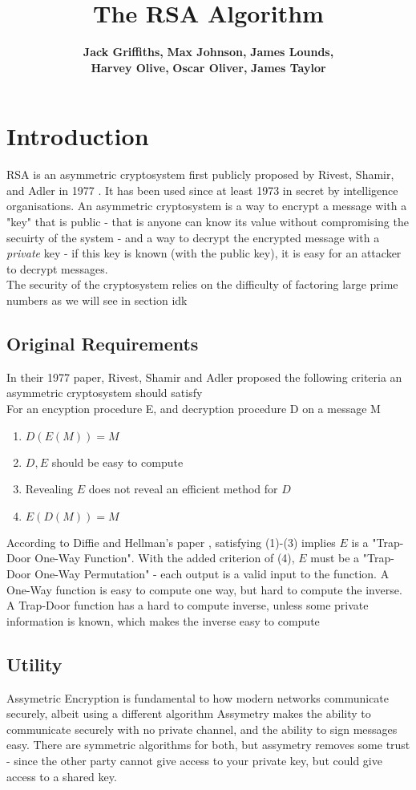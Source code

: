 \documentclass{article}
\author{
    {\bf Jack Griffiths,}
    {\bf Max Johnson,}
    {\bf James Lounds, } \\
    {\bf Harvey Olive, }
    {\bf Oscar Oliver, }
    {\bf James Taylor}
}
\title{The RSA Algorithm}
\begin{document}
\maketitle
\newpage

\section{Introduction}
RSA is an asymmetric cryptosystem first publicly proposed by Rivest, Shamir, and Adler in 1977 \cite{RSA}.
It has been used since at least 1973 in secret by intelligence organisations.
An asymmetric cryptosystem is a way to encrypt a message with a "key" that is public
- that is anyone can know its value without compromising the secuirty of the system -
and a way to decrypt the encrypted message with a \emph{private} key
- if this key is known (with the public key), it is easy for an attacker to decrypt messages.
\\
The security of the cryptosystem relies on the difficulty of factoring large prime numbers as we will see in section idk
\subsection{Original Requirements}
In their 1977 paper, Rivest, Shamir and Adler proposed the following criteria an asymmetric cryptosystem should satisfy
\\For an encyption procedure E, and decryption procedure D on a message M
\begin{enumerate}
    \item $D(E(M)) = M$
    \item $D, E$ should be easy to compute
    \item Revealing $E$ does not reveal an efficient method for $D$
    \item $E(D(M)) = M$
\end{enumerate}
According to Diffie and Hellman's paper \cite{Directions}, satisfying (1)-(3) implies $E$ is a "Trap-Door One-Way Function".
With the added criterion of (4), $E$ must be  a "Trap-Door One-Way Permutation" - each output is a valid input to the function.
A One-Way function is easy to compute one way, but hard to compute the inverse.
A Trap-Door function has a hard to compute inverse, unless some private information is known, which makes the inverse easy to compute

\subsection{Utility}
Assymetric Encryption is fundamental to how modern networks communicate securely, albeit using a different algorithm
Assymetry makes the ability to communicate securely with no private channel, and the ability to sign messages easy.
There are symmetric algorithms for both, but assymetry removes some trust - since the other party cannot give access to your private key, but could give access to a shared key.
\end{document}
